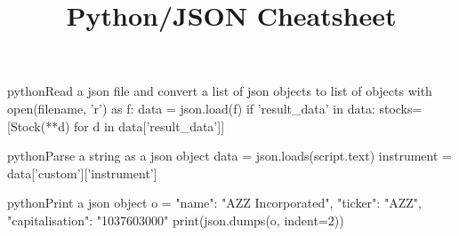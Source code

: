 \documentclass[10pt,a4paper]{article}
\title{\color{w3schools}Python/JSON Cheatsheet
}
\begin{document}
\maketitle
\small
\begin{multicols}{3}

\thispagestyle{empty}
\scriptsize

% 




\begin{codebox}{python}{Read a json file and convert a list of json objects to list of objects}
with open(filename, 'r') as f:
        data = json.load(f)
        if 'result_data' in data:
            stocks=[Stock(**d) for d in data['result_data']]

\end{codebox}

\begin{codebox}{python}{Parse a string as a json object}
data = json.loads(script.text)
instrument = data['custom']['instrument']

\end{codebox}

\begin{codebox}{python}{Print a json object}
o =   { "name": "AZZ Incorporated", "ticker": "AZZ", "capitalisation": "1037603000" }
print(json.dumps(o, indent=2))

\end{codebox}


\AtNextBibliography{\footnotesize}
\printbibliography  
\end{multicols}
\end{document}
